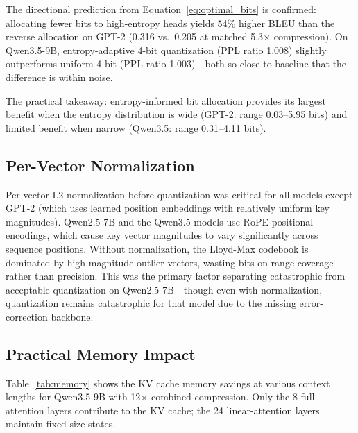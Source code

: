 \documentclass[11pt]{article}
\begin{document}
The directional prediction from Equation~\ref{eq:optimal_bits} is confirmed: allocating fewer bits to high-entropy heads yields 54\% higher BLEU than the reverse allocation on GPT-2 (0.316 vs.\ 0.205 at matched 5.3$\times$ compression).  On Qwen3.5-9B, entropy-adaptive 4-bit quantization (PPL ratio 1.008) slightly outperforms uniform 4-bit (PPL ratio 1.003)---both so close to baseline that the difference is within noise.

The practical takeaway: entropy-informed bit allocation provides its largest benefit when the entropy distribution is wide (GPT-2: range 0.03--5.95 bits) and limited benefit when narrow (Qwen3.5: range 0.31--4.11 bits).

\subsection{Per-Vector Normalization}
\label{sec:normalization}

Per-vector L2 normalization before quantization was critical for all models except GPT-2 (which uses learned position embeddings with relatively uniform key magnitudes).  Qwen2.5-7B and the Qwen3.5 models use RoPE positional encodings, which cause key vector magnitudes to vary significantly across sequence positions.  Without normalization, the Lloyd-Max codebook is dominated by high-magnitude outlier vectors, wasting bits on range coverage rather than precision.  This was the primary factor separating catastrophic from acceptable quantization on Qwen2.5-7B---though even with normalization, quantization remains catastrophic for that model due to the missing error-correction backbone.

\subsection{Practical Memory Impact}
\label{sec:memory_impact}

Table~\ref{tab:memory} shows the KV cache memory savings at various context lengths for Qwen3.5-9B with 12$\times$ combined compression.  Only the 8 full-attention layers contribute to the KV cache; the 24 linear-attention layers maintain fixed-size states.
\end{document}
